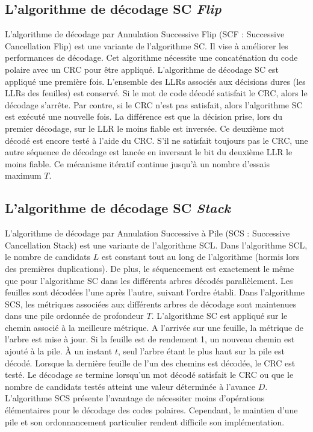 \subsection{L'algorithme de décodage SC \textit{Flip}}

	L'algorithme de décodage par Annulation Successive \og Flip \fg (SCF : Successive Cancellation Flip) \cite{afisiadis_low-complexity_2014} est une variante de l'algorithme SC. Il vise à améliorer les performances de décodage. Cet algorithme nécessite une concaténation du code polaire avec un CRC pour être appliqué. L'algorithme de décodage SC est appliqué une première fois. L'ensemble des LLRs associés aux décisions dures (les LLRs des feuilles) est conservé. Si le mot de code décodé satisfait le CRC, alors le décodage s'arrête. Par contre, si le CRC n'est pas satisfait, alors l'algorithme SC est exécuté une nouvelle fois. La différence est que la décision prise, lors du premier décodage, sur le LLR le moins fiable est inversée. Ce deuxième mot décodé est encore testé à l'aide du CRC. S'il ne satisfait toujours pas le CRC, une autre séquence de décodage est lancée en inversant le bit du deuxième LLR le moins fiable. Ce mécanisme itératif continue jusqu'à un nombre d'essais maximum $T$.


	\subsection{L'algorithme de décodage SC \textit{Stack}}
	L'algorithme de décodage par Annulation Successive à Pile (SCS : Successive Cancellation Stack) \cite{niu_stack_2012} est une variante de l'algorithme SCL. Dans l'algorithme SCL, le nombre de candidats $L$ est constant tout au long de l'algorithme (hormis lors des premières duplications). De plus, le séquencement est exactement le même que pour l'algorithme SC dans les différents arbres décodés parallèlement. Les feuilles sont décodées l'une après l'autre, suivant l'ordre établi. Dans l'algorithme SCS, les métriques associées aux différents arbres de décodage sont maintenues dans une pile ordonnée de profondeur $T$. L'algorithme SC est appliqué sur le chemin associé à la meilleure métrique. A l'arrivée sur une feuille, la métrique de l'arbre est mise à jour. Si la feuille est de rendement 1, un nouveau chemin est ajouté à la pile. \`A un instant $t$, seul l'arbre étant le plus haut sur la pile est décodé. Lorsque la dernière feuille de l'un des chemins est décodée, le CRC est testé. Le décodage se termine lorsqu'un mot décodé satisfait le CRC ou que le nombre de candidats testés atteint une valeur déterminée à l'avance $D$. L'algorithme SCS présente l'avantage de nécessiter moins d'opérations élémentaires pour le décodage des codes polaires. Cependant, le maintien d'une pile et son ordonnancement particulier rendent difficile son implémentation.

